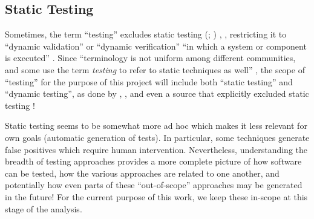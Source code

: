       \subsection{Static Testing}
      \label{static-test}
      Sometimes, the term ``testing'' excludes static testing
      \ifnotpaper
            (\citealp[p.~222]{AmmannAndOffutt2017}; \citealp[p.~13]{Firesmith2015})%
      \else
            \cite[p.~222]{AmmannAndOffutt2017}, \cite[p.~13]{Firesmith2015}%
      \fi, restricting it to ``dynamic validation'' \citep[p.~5-1]{SWEBOK2024} or
      ``dynamic verification'' ``in which a system or component is
      executed'' \citep[p.~427]{IEEE2017}. Since ``terminology is not uniform
      among different communities, and some use the term \emph{testing} to refer to
      static techniques as well''
      \citep[p.~5-2]{SWEBOK2024}, the scope of ``testing'' for the purpose of this
      project will include both ``static testing'' and ``dynamic testing'', as
      done by \citet[p.~17]{IEEE2022}, \citet[pp.~8-9]{Gerrard2000a}, and even a
      source that explicitly excluded static testing \citep[p.~440]{IEEE2017}!

      Static testing seems to be somewhat more ad hoc which makes it
      less relevant for own goals (automatic generation of tests). In particular,
      some techniques generate false positives which require human intervention.
      Nevertheless, understanding the breadth of testing approaches provides a more
      complete picture of how software can be tested, how the various approaches are
      related to one another, and potentially how even parts of these ``out-of-scope''
      approaches may be generated in the future! For the current purpose of this
      work, we keep these in-scope at this stage of the analysis.
\fi